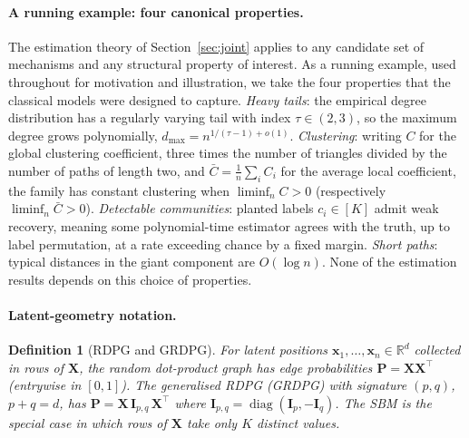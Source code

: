 \documentclass[12pt]{article}
\newtheorem{definition}{Definition}
\newcommand{\R}{\mathbb{R}}
\newcommand{\1}{\mathbf{1}}
\newcommand{\Pmat}{\mathbf{P}}
\newcommand{\X}{\mathbf{X}}
\newcommand{\I}{\mathbf{I}}
\newcommand{\x}{\mathbf{x}}
\DeclareMathOperator{\diag}{diag}
\begin{document}
\paragraph{A running example: four canonical properties.}
The estimation theory of Section~\ref{sec:joint} applies to any candidate set of mechanisms and any
structural property of interest. As a running example, used throughout for motivation and
illustration, we take the four properties that the classical models were designed to capture.
\emph{Heavy tails}: the empirical degree distribution has a regularly varying tail with index
$\tau\in(2,3)$, so the maximum degree grows polynomially, $d_{\max}=n^{1/(\tau-1)+o(1)}$.
\emph{Clustering}: writing $C$ for the global clustering coefficient, three times the number of
triangles divided by the number of paths of length two, and $\bar C=\frac1n\sum_iC_i$ for the
average local coefficient, the family has constant clustering when $\liminf_n C>0$ (respectively
$\liminf_n\bar C>0$). \emph{Detectable communities}: planted labels $c_i\in[K]$ admit weak recovery,
meaning some polynomial-time estimator agrees with the truth, up to label permutation, at a rate
exceeding chance by a fixed margin. \emph{Short paths}: typical distances in the giant component are
$O(\log n)$. None of the estimation results depends on this choice of properties.

\paragraph{Latent-geometry notation.}


\begin{definition}[RDPG and GRDPG]
\label{def:rdpg}
For latent positions $\x_1,\dots,\x_n\in\R^d$ collected in rows of $\X$, the \emph{random
dot-product graph} has edge probabilities $\Pmat=\X\X^\top$ (entrywise in $[0,1]$). The
\emph{generalised} RDPG (GRDPG) with signature $(p,q)$, $p+q=d$, has
$\Pmat=\X\,\I_{p,q}\,\X^\top$ where $\I_{p,q}=\diag(\I_p,-\I_q)$. The SBM is the special case in
which rows of $\X$ take only $K$ distinct values.
\end{definition}
\end{document}
